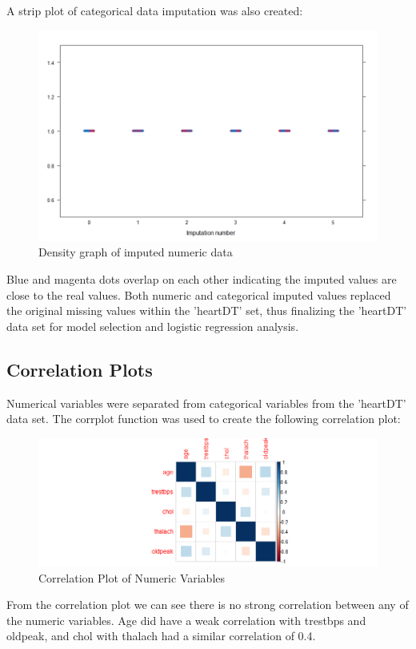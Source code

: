 \documentclass[12pt]{article}
\begin{document}
A strip plot of categorical data imputation was also created: 
\begin{figure}[h!]
\begin{center}
\includegraphics[scale=.35]{strip_impute_cat}
\caption{Density graph of imputed numeric data}
\end{center}
\end{figure}

Blue and magenta dots overlap on each other indicating the imputed values are close to the real values. Both numeric and categorical imputed values replaced the original missing values within the 'heartDT' set, thus finalizing the 'heartDT' data set for model selection and logistic regression analysis. 

\subsection{Correlation Plots}
Numerical variables were separated from categorical variables from the 'heartDT' data set. The corrplot function was used to create the following correlation plot: 

\begin{figure}[h!]
\begin{center}
\includegraphics[scale=.75]{correlation}
\caption{Correlation Plot of Numeric Variables}
\end{center}
\end{figure}
From the correlation plot we can see there is no strong correlation between any of the numeric variables. Age did have a weak correlation with trestbps and oldpeak, and chol with thalach had a similar correlation of 0.4. 
\end{document}
